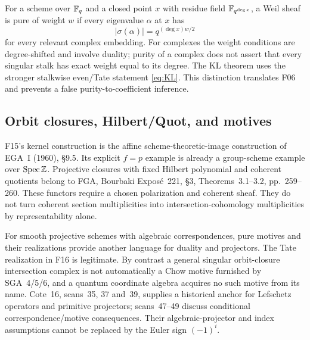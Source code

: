 \documentclass[11pt,a4paper]{article}
\newcommand{\fid}[1]{\textsf{#1}}\newcommand{\gate}[1]{\textsf{#1}}
\theoremstyle{named}\newtheorem{finding}{Finding}[section]
\theoremstyle{definition}\newtheorem{definition}[finding]{Definition}
\theoremstyle{remark}\newtheorem{remark}[finding]{Remark}
\begin{document}
For a scheme over $\mathbb F_q$ and a closed point $x$ with residue field $\mathbb F_{q^{\deg x}}$, a Weil sheaf is pure of weight $w$ if every eigenvalue $\alpha$ at $x$ has
\[
 |\sigma(\alpha)|=q^{(\deg x)w/2}
\]
for every relevant complex embedding. For complexes the weight conditions are degree-shifted and involve duality; purity of a complex does not assert that every singular stalk has exact weight equal to its degree. The KL theorem uses the stronger stalkwise even/Tate statement \eqref{eq:KL}. This distinction translates \fid{F06} and prevents a false purity-to-coefficient inference.

\subsection{Orbit closures, Hilbert/Quot, and motives}
\fid{F15}'s kernel construction is the affine scheme-theoretic-image construction of EGA~I (1960), \S9.5. Its explicit $f=p$ example is already a group-scheme example over $\operatorname{Spec}\mathbb Z$. Projective closures with fixed Hilbert polynomial and coherent quotients belong to FGA, Bourbaki Expos\'e~221, \S3, Theorems~3.1--3.2, pp.~259--260. These functors require a chosen polarization and coherent sheaf. They do not turn coherent section multiplicities into intersection-cohomology multiplicities by representability alone.

For smooth projective schemes with algebraic correspondences, pure motives and their realizations provide another language for duality and projectors. The Tate realization in \fid{F16} is legitimate. By contrast a general singular orbit-closure intersection complex is not automatically a Chow motive furnished by SGA~4/5/6, and a quantum coordinate algebra acquires no such motive from its name. Cote~16, scans~35, 37 and~39, supplies a historical anchor for Lefschetz operators and primitive projectors; scans~47--49 discuss conditional correspondence/motive consequences. Their algebraic-projector and index assumptions cannot be replaced by the Euler sign $(-1)^i$.
\end{document}
